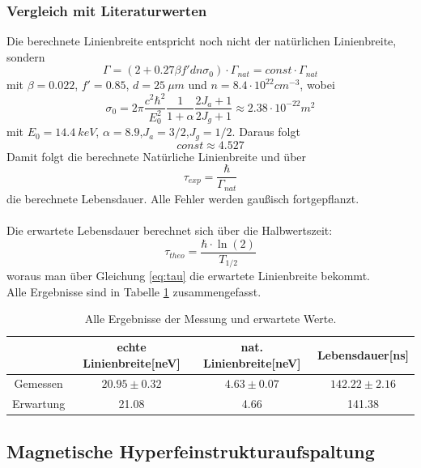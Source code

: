 \documentclass[12pt,a4paper]{article}
\begin{document}
\subsubsection{Vergleich mit Literaturwerten}
Die berechnete Linienbreite entspricht noch nicht der natürlichen Linienbreite, sondern
\begin{equation*}
\Gamma = (2+0.27\beta f' d n \sigma_0) \cdot \Gamma_{nat} = const \cdot \Gamma_{nat}
\end{equation*}
mit $\beta = 0.022$, $f' = 0.85$, $d = \SI{25}{\mu m}$ und $n=8.4\cdot 10^{22} \si{cm^{-3}}$, wobei 
\begin{equation*}
\sigma_0 = 2 \pi \dfrac{c^2 \hbar^2}{E_0^2} \dfrac{1}{1+\alpha} \dfrac{2 J_a+1}{2 J_g+1} \approx 2.38\cdot 10^{-22} m^2
\end{equation*}
mit $E_0 = \SI{14.4}{keV}$, $\alpha = 8.9$,$J_a = 3/2$,$J_g = 1/2$. Daraus folgt 
\begin{equation*}
const \approx 4.527
\end{equation*}
Damit folgt die berechnete Natürliche Linienbreite und über
\begin{equation}
\tau_{exp} = \dfrac{\hbar}{\Gamma_{nat}}
\label{eq:tau}
\end{equation}
die berechnete Lebensdauer. Alle Fehler werden gaußisch fortgepflanzt.\\
\\
Die erwartete Lebensdauer berechnet sich über die Halbwertszeit:
\begin{equation*}
\tau_{theo} = \dfrac{\hbar\cdot \ln(2)}{T_{1/2}}
\end{equation*}
woraus man über Gleichung \ref{eq:tau} die erwartete Linienbreite bekommt.\\
Alle Ergebnisse sind in Tabelle \ref{tab:Ein_lit} zusammengefasst.

\begin{table}
\centering
\begin{tabular}{|c|c|c|c|}
\hline 
 & echte Linienbreite[neV] & nat. Linienbreite[neV] & Lebensdauer[ns]\\ 
\hline 
Gemessen & $20.95\pm 0.32$ & $4.63\pm 0.07$ & $142.22\pm2.16$\\ 
\hline 
Erwartung & 21.08 & 4.66 & 141.38\\ 
\hline 
\end{tabular} 
\caption{Alle Ergebnisse der Messung und erwartete Werte.}
\label{tab:Ein_lit}
\end{table}


\subsection{Magnetische Hyperfeinstrukturaufspaltung}
\end{document}

